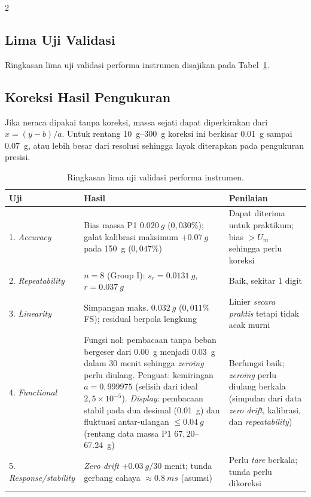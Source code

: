 \documentclass[a4paper, 12pt]{article}
\begin{document}
\begin{multicols}{2}
    \raggedcolumns
        \subsection{Lima Uji Validasi}
        Ringkasan lima uji validasi performa instrumen disajikan pada Tabel~\ref{tab:valid}.

        \subsection{Koreksi Hasil Pengukuran}
        Jika neraca dipakai tanpa koreksi, massa sejati dapat diperkirakan dari $x=(y-b)/a$. Untuk rentang \SIrange{10}{300}{g} koreksi ini berkisar \SI{0,01}{g} sampai \SI{0,07}{g}, atau lebih besar dari resolusi sehingga layak diterapkan pada pengukuran presisi.
\end{multicols}

\begin{table}[H]
\centering
\singlespacing
\caption{Ringkasan lima uji validasi performa instrumen.}
\label{tab:valid}
\small
\begin{tabularx}{\textwidth}{@{}l X X@{}}
\toprule
\textbf{Uji} & \textbf{Hasil} & \textbf{Penilaian}\\
\midrule
1. \textit{Accuracy} & Bias massa P1 $\SI{0,020}{g}$ ($0{,}030\%$); galat kalibrasi maksimum $+\SI{0,07}{g}$ pada \SI{150}{g} ($0{,}047\%$) & Dapat diterima untuk praktikum; bias $>U_m$ sehingga perlu koreksi\\
2. \textit{Repeatability} & $n=8$ (Group I): $s_r=\SI{0,0131}{g}$, $r=\SI{0,037}{g}$ & Baik, sekitar $1$ digit\\
3. \textit{Linearity} & Simpangan maks. $\SI{0,032}{g}$ ($0{,}011\%$ FS); residual berpola lengkung & Linier \textit{secara praktis} tetapi tidak acak murni\\
4. \textit{Functional} & Fungsi nol: pembacaan tanpa beban bergeser dari \SI{0,00}{g} menjadi \SI{0,03}{g} dalam $30$ menit sehingga \textit{zeroing} perlu diulang. Penguat: kemiringan $a=0{,}999975$ (selisih dari ideal $2{,}5\times10^{-5}$). \textit{Display}: pembacaan stabil pada dua desimal (\SI{0,01}{g}) dan fluktuasi antar-ulangan $\le\SI{0,04}{g}$ (rentang data massa P1 $67{,}20$--\SI{67,24}{g}) & Berfungsi baik; \textit{zeroing} perlu diulang berkala (simpulan dari data \textit{zero drift}, kalibrasi, dan \textit{repeatability})\\
5. \textit{Response/stability} & \textit{Zero drift} $+\SI{0,03}{g}/30$ menit; tunda gerbang cahaya $\approx\SI{0,8}{ms}$ (asumsi) & Perlu \textit{tare} berkala; tunda perlu dikoreksi\\
\bottomrule
\end{tabularx}
\end{table}
\end{document}
